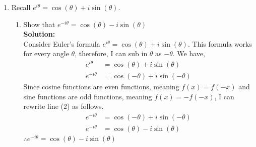 \documentclass[12pt]{book}
\begin{document}
\begin{enumerate}
\newpage

\item Recall $e^{i\theta} = \cos(\theta)+i\sin(\theta)$.
\begin{enumerate}
\item Show that $e^{-i\theta} = \cos(\theta) - i\sin(\theta)$\\

\textbf{Solution:}\\
\iffalse %
Consider two numbers $a$ and $b$ where $a=b$. Now consider the equation $a \times m = b \times n$. Since $a=b$ and $a\times m = b\times n$, it is also true that $m = n$.

By the same token, we have $e^{i\theta} = \cos(\theta)+i\sin(\theta)$ where $a=e^{i\theta}$,  $b=\cos(\theta)+i\sin(\theta)$ and $e^{-i\theta} = \cos(\theta) - i\sin(\theta)$ where $m=e^{-i\theta}$, $n=\cos(\theta) - i\sin(\theta)$. I will demonstrate that $e^{-i\theta} = \cos(\theta) - i\sin(\theta)$ with the same idea. \\

First, take $(\cos(\theta)+i\sin(\theta)) \times (\cos(\theta) - i\sin(\theta))$.
\setcounter{equation}{0}
\begin{align}
    &= ( \cos(\theta)+i\sin(\theta) ) ( \cos(\theta) - i\sin(\theta) ) \\
    &= \cos^2\theta - (i\sin\theta)^2 \\
    &= \cos^2\theta + \sin^2\theta \\
    &= 1
\end{align}
Now, take $e^{i\theta} \times e^{-i\theta}$.
\begin{align}
    &= e^{i\theta} \times e^{-i\theta} \\
    &= e^0 \\
    &= 1
\end{align}
Therefore, $[ \cos(\theta)+i\sin(\theta) ] [ \cos(\theta) - i\sin(\theta) ] = e^{i\theta} \times e^{-i\theta} = 1$.\\

Since $e^{i\theta} = \cos(\theta)+i\sin(\theta)$ and $[ \cos(\theta)+i\sin(\theta) ] [ \cos(\theta) - i\sin(\theta) ] = e^{i\theta} \times e^{-i\theta}$, it is true that $e^{-i\theta} = \cos(\theta) - i\sin(\theta)$.
\fi%
Consider Euler's formula $e^{i\theta} = \cos(\theta)+i\sin(\theta)$. This formula works for every angle $\theta$, therefore, I can sub in $\theta$ as $-\theta$. We have,
\setcounter{equation}{0}
\begin{align}
    e^{i\theta} &= \cos(\theta)+i\sin(\theta) \\
    e^{-i\theta} &= \cos(-\theta)+i\sin(-\theta) 
\end{align}
Since cosine functions are even functions, meaning $f(x) = f(-x)$ and sine functions are odd functions, meaning $f(x) = -f(-x)$, I can rewrite line (2) as follows.
\begin{align}
    e^{-i\theta} &= \cos(-\theta)+i\sin(-\theta) \\
    e^{-i\theta} &= \cos(\theta)-i\sin(\theta) 
\end{align}
$\therefore e^{-i\theta} = \cos(\theta) - i\sin(\theta)$



\end{enumerate}
\end{enumerate}
\end{document}
